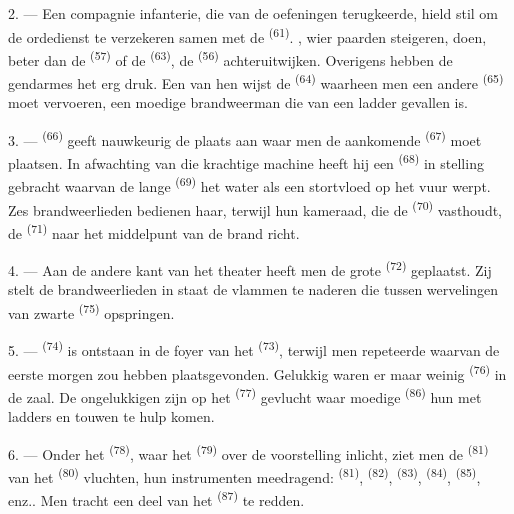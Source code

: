 2. --- Een compagnie infanterie, die van de oefeningen terugkeerde, hield stil om de
ordedienst te verzekeren samen met de  \textsuperscript{(61)}.
, wier paarden steigeren, doen, beter dan de
 \textsuperscript{(57)} of de 
\textsuperscript{(63)}, de  \textsuperscript{(56)} achteruitwijken.
Overigens hebben de gendarmes het erg druk. Een van hen wijst de 
\textsuperscript{(64)} waarheen men een andere
 \textsuperscript{(65)} moet vervoeren, een moedige brandweerman
die van een ladder gevallen is.

3. ---  \textsuperscript{(66)} geeft nauwkeurig de plaats aan waar men de
aankomende  \textsuperscript{(67)} moet plaatsen. In afwachting van die
krachtige machine heeft hij een
 \textsuperscript{(68)} in stelling gebracht waarvan de lange
 \textsuperscript{(69)} het water als een stortvloed op het vuur
werpt. Zes brandweerlieden bedienen haar, terwijl hun kameraad, die de
 \textsuperscript{(70)} vasthoudt, de 
\textsuperscript{(71)} naar het middelpunt van de brand richt.

4. --- Aan de andere kant van het theater heeft men de grote 
\textsuperscript{(72)} geplaatst. Zij stelt de brandweerlieden in staat de vlammen te naderen
die tussen wervelingen van zwarte  \textsuperscript{(75)} opspringen.

\VUsaut{5.0mm}
\VUsaut{3.4mm}

5. ---  \textsuperscript{(74)} is ontstaan in de foyer van het
 \textsuperscript{(73)}, terwijl men 
repeteerde waarvan de eerste  morgen zou hebben plaatsgevonden. Gelukkig
waren er maar weinig  \textsuperscript{(76)} in de zaal. De ongelukkigen
zijn op het  \textsuperscript{(77)} gevlucht waar moedige
 \textsuperscript{(86)} hun met ladders en touwen te hulp komen.

6. --- Onder het  \textsuperscript{(78)}, waar het
 \textsuperscript{(79)} over de voorstelling inlicht, ziet
men de  \textsuperscript{(81)} van het 
\textsuperscript{(80)} vluchten, hun instrumenten meedragend: 
\textsuperscript{(81)},  \textsuperscript{(82)},
 \textsuperscript{(83)}, 
\textsuperscript{(84)},  \textsuperscript{(85)}, enz.. Men tracht een deel van
het  \textsuperscript{(87)} te redden.

